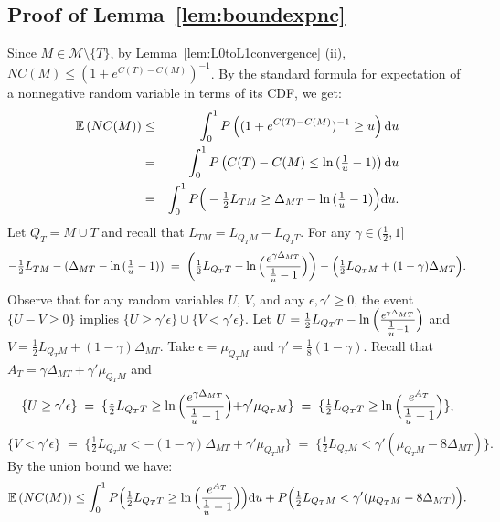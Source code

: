 \documentclass[aos]{imsart}
\theoremstyle{plain}
\newcommand{\E}{\mathbb{E}}
\begin{document}
\begin{supplement}
\subsection{Proof of Lemma~\ref{lem:boundexpnc}}
Since $M\in \mathcal M\setminus \{T\}$, by Lemma~\ref{lem:L0toL1convergence} (ii),  $NC(M)\leq (1+e^{C(T)-C(M)})^{-1}$.  By the standard formula for expectation of a nonnegative random variable in terms of its CDF, we get:
\begin{eqnarray*}
  \E\left(NC(M)\right)  &\leq& \int_0^1 P\left((1+e^{C(T)-C(M)})^{-1}\geq u\right){\rm d} u\\
  &=&\int_0^1 P\left(C(T)-C(M) \leq \ln{(\tfrac1u-1)}\right){\rm d}u\\
  &=&\int_0^1 P\Big(-\tfrac12 L_{TM} \geq \Delta_{MT}-\ln{(\tfrac1u-1)}\Big) {\rm d}u.
\end{eqnarray*}
Let $Q_T=M \cup T$ and recall that $L_{TM}=L_{Q_TM}-L_{Q_TT}$. For any $\gamma\in (\frac{1}{2},1]$
$$
-\tfrac12 L_{TM} -(\Delta_{MT}-\ln{(\tfrac1u-1)})\;=\;\left(\tfrac12 L_{Q_TT}-\ln{\Bigl(\frac{e^{\gamma\Delta_{MT}}}{\tfrac1u-1}\Bigl)}\right)-\Bigl(\tfrac12 L_{Q_TM}+(1-\gamma)\Delta_{MT}\Bigl).
$$
Observe that for any random variables $U$, $V$, and any $\epsilon,\gamma' \geq 0$, the event $
\{U-V \geq 0\}$ implies $\{U \geq \gamma' \epsilon\}\cup
\{V  < \gamma' \epsilon\}$. Let $U=\tfrac12 L_{Q_TT}-\ln{\Bigl(\frac{e^{\gamma\Delta_{MT}}}{\tfrac1u-1}\Bigl)}$ and $V=\tfrac12 L_{Q_TM}+(1-\gamma)\Delta_{MT}$. Take $\epsilon=\mu_{Q_TM}$ and $\gamma'=\tfrac18({1-\gamma})$. Recall that $A_T=\gamma\Delta_{MT}+\gamma'\mu_{Q_TM}$ and
$$
\{U\geq \gamma'\epsilon\}\;=\;\{\tfrac12 L_{Q_TT}\geq \ln{\Bigl(\frac{e^{\gamma\Delta_{MT}}}{\tfrac1u-1}}\Bigl)+\gamma'\mu_{Q_TM}\}\;=\;\{\tfrac12 L_{Q_TT}\geq \ln{\Bigl(\frac{e^{A_T}}{\tfrac1u-1}}\Bigl)\},
$$
$$
\{V<\gamma'\epsilon\}\;=\;\{\tfrac12 L_{Q_TM}<-(1-\gamma)\Delta_{MT}+\gamma'\mu_{Q_TM}\}\;=\;\{\tfrac12 L_{Q_TM}<\gamma'(\mu_{Q_TM}-8\Delta_{MT})\}.
$$
By the union bound we have:
\begin{equation}\label{eq:prooflemmas20nonspu}
    \E\left(NC(M)\right)  \leq \int_0^1P\Bigl(\tfrac12 L_{Q_TT}\geq \ln{\Bigl(\frac{e^{A_T}}{\tfrac1u-1}\Bigl)}\Bigl){\rm d}u+ P\Bigl(\tfrac12 L_{Q_TM}<\gamma'(\mu_{Q_TM}-8\Delta_{MT})\Bigl).
\end{equation}

\end{supplement}
\end{document}
